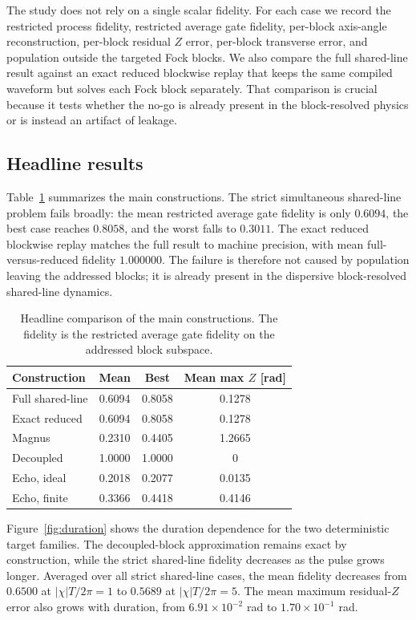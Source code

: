 \documentclass[aps,pra,twocolumn,reprint,floatfix,amsmath,amssymb]{revtex4-2}
\begin{document}
The study does not rely on a single scalar fidelity. For each case we record the restricted process fidelity, restricted average gate fidelity, per-block axis-angle reconstruction, per-block residual \(Z\) error, per-block transverse error, and population outside the targeted Fock blocks. We also compare the full shared-line result against an exact reduced blockwise replay that keeps the same compiled waveform but solves each Fock block separately. That comparison is crucial because it tests whether the no-go is already present in the block-resolved physics or is instead an artifact of leakage.

\subsection{Headline results}

Table~\ref{tab:headline} summarizes the main constructions. The strict simultaneous shared-line problem fails broadly: the mean restricted average gate fidelity is only \(0.6094\), the best case reaches \(0.8058\), and the worst falls to \(0.3011\). The exact reduced blockwise replay matches the full result to machine precision, with mean full-versus-reduced fidelity \(1.000000\). The failure is therefore not caused by population leaving the addressed blocks; it is already present in the dispersive block-resolved shared-line dynamics.

\begin{table}[tb]
  \centering
  \small
  \caption{Headline comparison of the main constructions. The fidelity is the restricted average gate fidelity on the addressed block subspace.}
  \label{tab:headline}
  \begin{tabular}{@{}lccc@{}}
    \toprule
    Construction & Mean & Best & Mean max \(Z\) [rad] \\
    \midrule
    Full shared-line & 0.6094 & 0.8058 & 0.1278 \\
    Exact reduced & 0.6094 & 0.8058 & 0.1278 \\
    Magnus & 0.2310 & 0.4405 & 1.2665 \\
    Decoupled & 1.0000 & 1.0000 & 0 \\
    Echo, ideal & 0.2018 & 0.2077 & 0.0135 \\
    Echo, finite & 0.3366 & 0.4418 & 0.4146 \\
    \bottomrule
  \end{tabular}
\end{table}

Figure~\ref{fig:duration} shows the duration dependence for the two deterministic target families. The decoupled-block approximation remains exact by construction, while the strict shared-line fidelity decreases as the pulse grows longer. Averaged over all strict shared-line cases, the mean fidelity decreases from \(0.6500\) at \(|\chi|T/2\pi=1\) to \(0.5689\) at \(|\chi|T/2\pi=5\). The mean maximum residual-\(Z\) error also grows with duration, from \(6.91\times 10^{-2}\) rad to \(1.70\times 10^{-1}\) rad.
\end{document}
